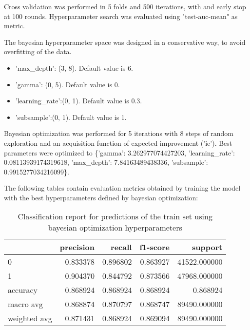 \documentclass{article}
\begin{document}
\begin{itemize}
\begin{itemize}
\end{itemize}

Cross validation was performed in 5 folds and 500 iterations, with and early stop at 100 rounds.
Hyperparameter search was evaluated using "test-auc-mean" as metric.

The bayesian hyperparameter space was designed in a conservative way, to avoid overfitting of the data.
\begin{itemize}
	\item 'max\_depth': (3, 8).  Default value is 6. 
	\item 'gamma': (0, 5). Default value is 0.
	\item 'learning\_rate':(0, 1). Default value is 0.3.
	\item 'subsample':(0, 1). Default value is 1.
\end{itemize}

Bayesian optimization was performed for 5 iterations with 8 steps of random exploration and an acquisition function of expected improvement ('ie'). Best parameters were optimized to \{'gamma': 3.262977074427203, 'learning\_rate': 0.08113939174319618, 'max\_depth': 7.84163489438336, 'subsample': 0.9915277034216099\}.

The following tables contain evaluation metrics obtained by training the model with the best hyperparameters defined by bayesian optimization:

\begin{table}[h!]
\centering
\begin{tabular}{lrrrr}
\toprule
{} &  precision &    recall &  f1-score &       support \\
\midrule
0            &   0.833378 &  0.896802 &  0.863927 &  41522.000000 \\
1            &   0.904370 &  0.844792 &  0.873566 &  47968.000000 \\
accuracy     &   0.868924 &  0.868924 &  0.868924 &      0.868924 \\
macro avg    &   0.868874 &  0.870797 &  0.868747 &  89490.000000 \\
weighted avg &   0.871431 &  0.868924 &  0.869094 &  89490.000000 \\
\bottomrule
\end{tabular}
\caption{Classification report for predictions of the train set using bayesian optimization hyperparameters}
\label{table:model_tr_bo_cr}
\end{table}

\begin{table}[h!]
\centering


\end{table}
\end{itemize}
\end{document}
